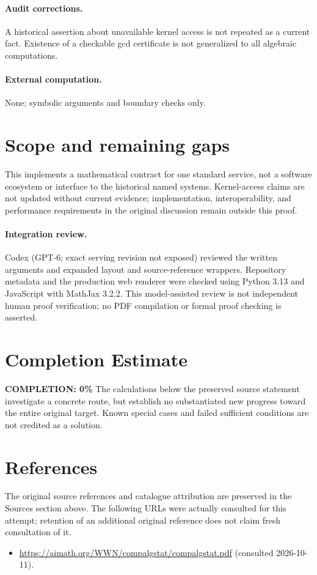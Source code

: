 \documentclass[11pt]{article}
\begin{document}
\paragraph{Audit corrections.} A historical assertion about unavailable kernel access is not repeated as a current fact. Existence of a checkable gcd certificate is not generalized to all algebraic computations.
\paragraph{External computation.} None; symbolic arguments and boundary checks only.
\section{Scope and remaining gaps}
This implements a mathematical contract for one standard service, not a software ecosystem or interface to the historical named systems. Kernel-access claims are not updated without current evidence; implementation, interoperability, and performance requirements in the original discussion remain outside this proof.
\paragraph{Integration review.} Codex (GPT-6; exact serving revision not exposed) reviewed the written arguments and expanded layout and source-reference wrappers. Repository metadata and the production web renderer were checked using Python 3.13 and JavaScript with MathJax 3.2.2. This model-assisted review is not independent human proof verification; no PDF compilation or formal proof checking is asserted.

\section{Completion Estimate}
\noindent\textbf{COMPLETION: 0\%}
The calculations below the preserved source statement investigate a concrete route,
but establish no substantiated new progress toward the entire original target.
Known special cases and failed sufficient conditions are not credited as a solution.
\section{References}
The original source references and catalogue attribution are preserved in the
Sources section above. The following URLs were actually consulted for this attempt;
retention of an additional original reference does not claim fresh consultation of it.
\begin{itemize}
\item \url{https://aimath.org/WWN/compalgstat/compalgstat.pdf} (consulted 2026-10-11). 
\end{itemize}
\end{document}
